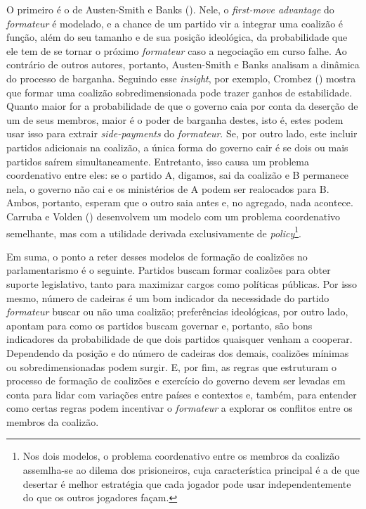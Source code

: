 O primeiro é o de Austen-Smith e Banks (\citeyear{austen1988}). Nele, o \textit{first-move advantage} do \textit{formateur} é modelado, e a chance de um partido vir a integrar uma coalizão é função, além do seu tamanho e de sua posição ideológica, da probabilidade que ele tem de se tornar o próximo \textit{formateur} caso a negociação em curso falhe. Ao contrário de outros autores, portanto, Austen-Smith e Banks analisam a dinâmica do processo de barganha. Seguindo esse \textit{insight}, por exemplo, Crombez (\citeyear{crombez1996}) mostra que formar uma coalizão sobredimensionada pode trazer ganhos de estabilidade. Quanto maior for a probabilidade de que o governo caia por conta da deserção de um de seus membros, maior é o poder de barganha destes, isto é, estes podem usar isso para extrair \textit{side-payments} do \textit{formateur}. Se, por outro lado, este incluir partidos adicionais na coalizão, a única forma do governo cair é se dois ou mais partidos saírem simultaneamente. Entretanto, isso causa um problema coordenativo entre eles: se o partido A, digamos, sai da coalizão e B permanece nela, o governo não cai e os ministérios de A podem ser realocados para B. Ambos, portanto, esperam que o outro saia antes e, no agregado, nada acontece. Carruba e Volden (\citeyear{volden2004}) desenvolvem um modelo com um problema coordenativo semelhante, mas com a utilidade derivada exclusivamente de \textit{policy}\footnote{Nos dois modelos, o problema coordenativo entre os membros da coalizão assemlha-se ao dilema dos prisioneiros, cuja característica principal é a de que desertar é melhor estratégia que cada jogador pode usar independentemente do que os outros jogadores façam.}.

Em suma, o ponto a reter desses modelos de formação de coalizões no parlamentarismo é o seguinte. Partidos buscam formar coalizões para obter suporte legislativo, tanto para maximizar cargos como políticas públicas. Por isso mesmo, número de cadeiras é um bom indicador da necessidade do partido \textit{formateur} buscar ou não uma coalizão; preferências ideológicas, por outro lado, apontam para como os partidos buscam governar e, portanto, são bons indicadores da probabilidade de que dois partidos quaisquer venham a cooperar. Dependendo da posição e do número de cadeiras dos demais, coalizões mínimas ou sobredimensionadas podem surgir. E, por fim, as regras que estruturam o processo de formação de coalizões e exercício do governo devem ser levadas em conta para lidar com variações entre países e contextos e, também, para entender como certas regras podem incentivar o \textit{formateur} a explorar os conflitos entre os membros da coalizão.